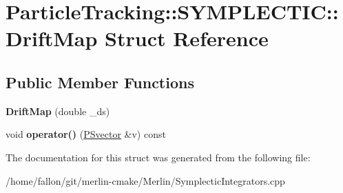 \hypertarget{structParticleTracking_1_1SYMPLECTIC_1_1DriftMap}{}\section{Particle\+Tracking\+:\+:S\+Y\+M\+P\+L\+E\+C\+T\+IC\+:\+:Drift\+Map Struct Reference}
\label{structParticleTracking_1_1SYMPLECTIC_1_1DriftMap}
\subsection*{Public Member Functions}
\begin{DoxyCompactItemize}
\item 
\mbox{\label{structParticleTracking_1_1SYMPLECTIC_1_1DriftMap_a80b6ab7ccd49226e6badf3e54180d3a8}} 
{\bfseries Drift\+Map} (double \+\_\+ds)
\item 
\mbox{\label{structParticleTracking_1_1SYMPLECTIC_1_1DriftMap_ac7126df37adc5bb08d4e1fbc6165e425}} 
void {\bfseries operator()} (\hyperlink{classPSvector}{P\+Svector} \&v) const
\end{DoxyCompactItemize}


The documentation for this struct was generated from the following file\+:\begin{DoxyCompactItemize}
\item 
/home/fallon/git/merlin-\/cmake/\+Merlin/Symplectic\+Integrators.\+cpp\end{DoxyCompactItemize}
